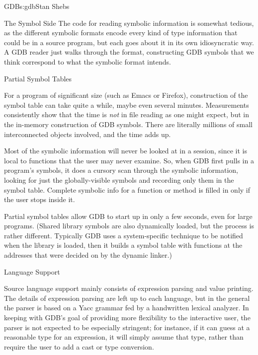 \begin{aosachapter}{GDB}{s:gdb}{Stan Shebs}
\begin{aosasect1}{The Symbol Side}
The code for reading symbolic information is somewhat tedious, as the
different symbolic formats encode every kind of type information that
could be in a source program, but each goes about it in its own
idiosyncratic way.  A GDB reader just walks through the format,
constructing GDB symbols that we think correspond to what the symbolic
format intends.

\end{aosasect1}

\begin{aosasect2}{Partial Symbol Tables}

For a program of significant size (such as Emacs or Firefox),
construction of the symbol table can take quite a while, maybe even
several minutes.  Measurements consistently show that the time is
{\em not} in file reading as one might expect, but in the in-memory
construction of GDB symbols. There are literally millions of small
interconnected objects involved, and the time adds up.

Most of the symbolic information will never be looked at in a session,
since it is local to functions that the user may never examine.  So,
when GDB first pulls in a program's symbols, it does a cursory scan
through the symbolic information, looking for just the
globally-visible symbols and recording only them in the symbol table.
Complete symbolic info for a function or method is filled in only if
the user stops inside it.

Partial symbol tables allow GDB to start up in only a few seconds, even
for large programs. (Shared library symbols are also dynamically loaded, but the process
is rather different.  Typically GDB uses a system-specific technique
to be notified when the library is loaded, then it builds a symbol
table with functions at the addresses that were decided on by the
dynamic linker.)

\end{aosasect2}

\begin{aosasect2}{Language Support}

Source language support mainly consists of expression parsing and value printing.  The details of expression parsing are left up to each language, but in
the general the parser is based on a Yacc grammar fed by a
handwritten lexical analyzer.  In keeping with GDB's goal of providing
more flexibility to the interactive user, the parser is not expected
to be especially stringent; for instance, if it can guess at a
reasonable type for an expression, it will simply assume that type,
rather than require the user to add a cast or type conversion.


\end{aosasect2}
\end{aosachapter}
